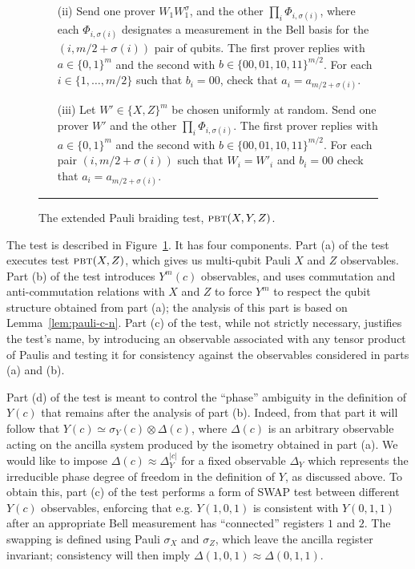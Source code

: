 \begin{figure}[H]
\begin{itemize}
\begin{enumerate}
\begin{enumerate}
\item[(ii)] Send one prover $W_1  W_1^\sigma$, and the other $\prod_i \Phi_{i,\sigma(i)}$, where each $\Phi_{i,\sigma(i)}$ designates a measurement in the Bell basis for the $(i,m/2+\sigma(i))$ pair of qubits. 
    The first prover replies with $a\in\{0, 1 \}^m$ and the second with $b\in \{00,01,10,11\}^{m/2}$. For each
    $i\in\{1,\ldots,m/2\}$ such that $b_i = 00$, check that $a_i  = a_{m/2+\sigma(i)}$. 
		\item[(iii)] Let $W'\in\{X,Z\}^m$ be chosen uniformly at random. Send one prover $W'$ and the other $\prod_i \Phi_{i,\sigma(i)}$. The first prover replies  with $a\in\{0, 1 \}^m$ and the second with $b\in \{00,01,10,11\}^{m/2}$. For each pair $(i,m/2+\sigma(i))$ such that $W_i=W'_i$ and $b_i=00$ check that $a_i=a_{m/2+\sigma(i)}$. 
\end{enumerate}
\end{enumerate}
\end{itemize}
\rule[2ex]{\textwidth}{0.5pt}\vspace{-.5cm}
\caption{The extended Pauli braiding test, $\textsc{pbt}(X,Y,Z)$.}
\label{fig:e-pbt}
\end{figure}


The test is described in Figure~\ref{fig:e-pbt}. It has four components. Part (a) of the test executes test $\textsc{pbt}(X,Z)$, which gives us multi-qubit Pauli $X$ and $Z$ observables. 
Part (b) of the test introduces $Y^m(c)$ observables, and uses commutation and anti-commutation relations with $X$ and $Z$ to force $Y^m$ to respect the qubit structure obtained from part (a); the analysis of this part is based on Lemma~\ref{lem:pauli-c-n}. Part (c) of the test, while not strictly necessary, justifies the test's name, by introducing an observable associated with any tensor product of Paulis and testing it for consistency against the observables considered in parts (a) and (b). 

Part (d) of the test is meant to control the ``phase'' ambiguity in the definition of $Y(c)$ that remains after the analysis of part (b). Indeed, from that part it will follow that $Y(c) \simeq \sigma_Y(c) \otimes \Delta(c)$, where $\Delta(c)$ is an arbitrary observable acting on the ancilla system produced by the isometry obtained in part (a). We would like to impose $\Delta(c) \approx \Delta_Y^{|c|}$ for a fixed observable $\Delta_Y$ which  represents the irreducible phase degree of freedom in the definition of $Y$, as discussed above. To obtain this, part (c) of the test performs a form of SWAP test between different $Y(c)$ observables, enforcing that e.g. $Y(1,0,1)$ is consistent with $Y(0,1,1)$ after an appropriate Bell measurement has ``connected'' registers $1$ and $2$. The swapping is defined using Pauli $\sigma_X$ and $\sigma_Z$, which leave the ancilla register invariant; consistency will then imply $\Delta(1,0,1) \approx \Delta(0,1,1)$.  

